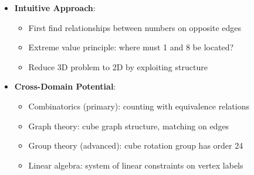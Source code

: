 \documentclass[]{article}
\begin{document}
\begin{problemconfigbox}
\begin{itemize}[leftmargin=*]
    \item \textbf{Intuitive Approach}:
    \begin{itemize}
        \item First find relationships between numbers on opposite edges
        \item Extreme value principle: where must 1 and 8 be located?
        \item Reduce 3D problem to 2D by exploiting structure
    \end{itemize}
    
    \item \textbf{Cross-Domain Potential}:
    \begin{itemize}
        \item Combinatorics (primary): counting with equivalence relations
        \item Graph theory: cube graph structure, matching on edges
        \item Group theory (advanced): cube rotation group has order 24
        \item Linear algebra: system of linear constraints on vertex labels
    \end{itemize}
\end{itemize}
\end{problemconfigbox}
\end{document}
